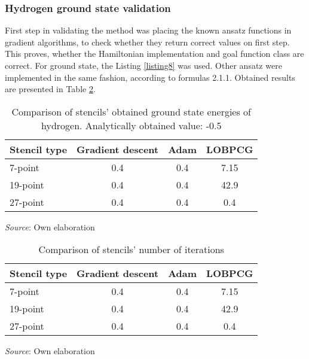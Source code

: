 \subsubsection{Hydrogen ground state validation}

First step in validating the method was placing the known ansatz functions in gradient algorithms, to check whether they return correct values on first step. This proves, whether the Hamiltonian implementation and goal function class are correct. For ground state, the Listing \ref{listing8} was used. Other ansatz were implemented in the same fashion, according to formulas 2.1.1. Obtained results are presented in Table \ref{tab:stencil-comparison-ground-state-values}.

\begin{table}[!ht]
	\centering
	\caption{Comparison of stencils' obtained ground state energies of hydrogen. Analytically obtained value: -0.5}
	\label{tab:stencil-comparison-ground-state-values}
	\small %
	\begin{tabular}{|l|c|c|c|}
		\hline
		\textbf{Stencil type}    & \textbf{Gradient descent} & \textbf{Adam} & \textbf{LOBPCG} \\ \hline
		7-point                  & 0.4                       & 0.4           & 7.15       \\ \hline
		19-point                 & 0.4                       & 0.4           & 42.9       \\ \hline
		27-point                 & 0.4                       & 0.4           & 0.4        \\ \hline
	\end{tabular}
	
	\smallskip
	\small \textit{Source}: Own elaboration
\end{table}


\begin{table}[!ht]
	\centering
	\caption{Comparison of stencils' number of iterations}
	\label{tab:stencil-comparison-ground-state-values}
	\small %
	\begin{tabular}{|l|c|c|c|}
		\hline
		\textbf{Stencil type}    & \textbf{Gradient descent} & \textbf{Adam} & \textbf{LOBPCG} \\ \hline
		7-point                  & 0.4                       & 0.4           & 7.15       \\ \hline
		19-point                 & 0.4                       & 0.4           & 42.9       \\ \hline
		27-point                 & 0.4                       & 0.4           & 0.4        \\ \hline
	\end{tabular}
	
	\smallskip
	\small \textit{Source}: Own elaboration
\end{table}

